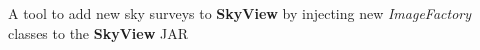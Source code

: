 



\begin{cvparagraph}
    A tool to add new sky surveys to \textbf{SkyView} by injecting new \textit{ImageFactory} classes to the \textbf{SkyView} JAR
\end{cvparagraph}

